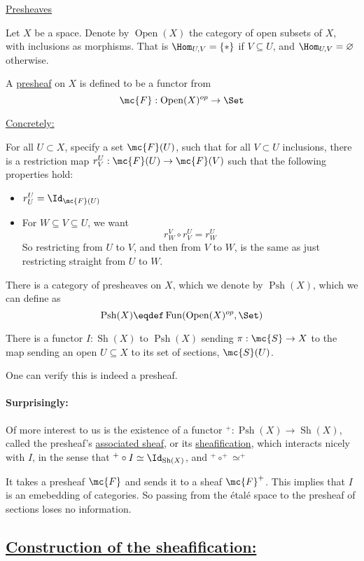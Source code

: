 \documentclass[x11names,reqno,14pt]{extarticle}
\DeclareMathOperator{\Sh}{Sh}
\DeclareMathOperator{\Psh}{Psh}
\DeclareMathOperator{\Fun}{Fun}
\begin{document}
\underline{Presheaves}

Let $X$ be a space. Denote by $\operatorname{Open}(X)$ the category of open subsets of $X$, with inclusions as morphisms. That is $\Hom_{U,V} = \{*\}$ if $V\subseteq U$, and $\Hom_{U,V} = \varnothing$ otherwise. 


A \underline{presheaf} on $X$ is defined to be a functor from 
\[
\mc{F}:\operatorname{Open}(X)^{op} \to \Set
\]

\underline{Concretely:}

For all $U \subset X$, specify a set $\mc{F}(U)$, such that for all $V \subset U$ inclusions, there is a restriction map $r^U_V:\mc{F}(U)\to\mc{F}(V)$ such that the following properties hold: 
\begin{itemize}

\item $r^U_U = \Id_{\mc{F}(U)}$

\item For $W \subseteq V \subseteq U$, we want 
\[
r^V_W \circ r^U_V = r^U_W
\]
So restricting from $U$ to $V$, and then from $V$ to $W$, is the same as just restricting straight from $U$ to $W$.
\end{itemize}

There is a category of presheaves on $X$, which we denote by $\Psh(X)$, which we can define as 
\[
\Psh(X) \eqdef \Fun(\operatorname{Open}(X)^{op},\Set)
\]

There is a functor $I: \Sh(X)$ to $\Psh(X)$ sending $\pi:\mc{S}\to X$ to the map sending an open $U \subseteq X$ to its set of sections, $\mc{S}(U)$.

One can verify this is indeed a presheaf.

\paragraph{Surprisingly:} Of more interest to us is the existence of a functor $^+:\Psh(X)\to\Sh(X)$, called the presheaf's \underline{associated sheaf}, or its \underline{sheafification}, which interacts nicely with $I$, in the sense that $^+\circ I \simeq \Id_{\Sh(X)}$, and $^+\circ^+ \simeq ^+$

It takes a presheaf $\mc{F}$ and sends it to a sheaf $\mc{F}^+$. This implies that $I$ is an emebedding of categories. So passing from the \'etal\'e space to the presheaf of sections loses no information. 

\subsection*{\underline{Construction of the sheafification:}}
\end{document}
